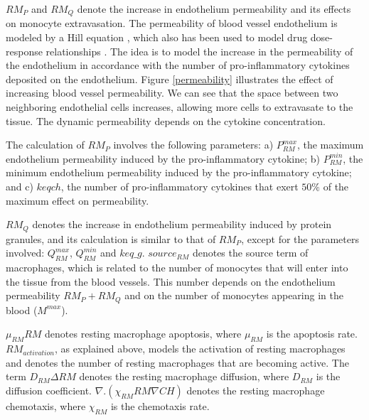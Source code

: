 \documentclass[10pt]{bmc_article}
\newenvironment{bmcformat}{\baselineskip20pt\sloppy\setboolean{publ}{false}}{\baselineskip20pt\sloppy}
\begin{document}
\begin{bmcformat}
$RM_{P}$ and $RM_{Q}$ denote the increase in endothelium permeability and its effects on monocyte extravasation. The permeability of 
blood vessel endothelium is modeled by a Hill equation \cite{Goutelle2008}, which also has been used to model drug dose-response 
relationships \cite{Wagner1968}. The idea is to model the increase in the permeability of the endothelium in accordance with the 
number of pro-inflammatory cytokines deposited on the endothelium. Figure \ref{permeability} illustrates the effect of increasing  
blood vessel permeability. We can see that the space between two neighboring endothelial cells increases, 
allowing more cells to extravasate to the tissue. The dynamic permeability depends on the cytokine concentration. 


The calculation of $RM_{P}$ involves the following parameters: a) $P^{max}_{RM}$, the maximum endothelium permeability induced by the 
pro-inflammatory cytokine; b) $P^{min}_{RM}$, the minimum endothelium permeability induced by the pro-inflammatory cytokine; and 
c) $keqch$, the number of pro-inflammatory cytokines that exert $50\%$ of the maximum effect on permeability. 

$RM_{Q}$ denotes the increase in endothelium permeability induced by protein granules, and its calculation is similar to that of $RM_{P}$, 
except for the parameters involved: $Q^{max}_{RM}$, $Q^{min}_{RM}$ and $keq\_g$. $source_{RM}$ denotes the source term of macrophages, 
which is related to the number of monocytes that will enter into the tissue from the blood vessels. 
This number depends on the endothelium permeability $RM_{P} + RM_{Q}$ and on the number of monocytes appearing in the blood ($M^{max}$).
 
$\mu_{RM} RM$ denotes resting macrophage apoptosis, where $\mu_{RM}$ is the apoptosis rate. $RM_{activation}$, as explained above, models 
the activation of resting macrophages and denotes the number of resting macrophages that are becoming active. The term $D_{RM} \Delta RM$ 
denotes the resting macrophage diffusion, where $D_{RM}$ is the diffusion coefficient. $\nabla. (\chi_{RM} RM \nabla CH)$ denotes the 
resting macrophage chemotaxis, where $\chi_{RM}$ is the chemotaxis rate.


\end{bmcformat}
\end{document}

